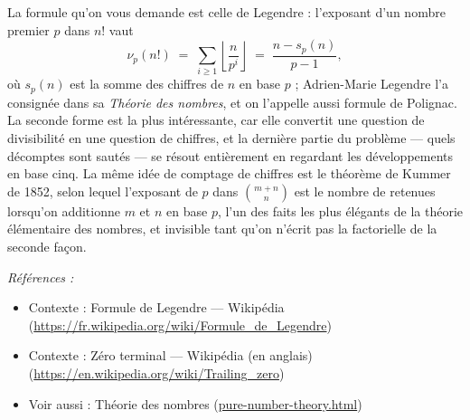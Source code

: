 \documentclass[11pt]{article}
\newenvironment{refs}{\par\small\noindent\emph{Références :}\begin{itemize}\setlength\itemsep{0pt}}{\end{itemize}\normalsize}
\begin{document}
\noindent La formule qu'on vous demande est celle de Legendre : l'exposant d'un
nombre premier $ p $ dans $ n! $ vaut
\[ \nu_p(n!) \;=\; \sum_{i \ge 1} \left\lfloor \frac{n}{p^{i}} \right\rfloor
\;=\; \frac{n - s_p(n)}{p - 1}, \]
où $ s_p(n) $ est la somme des chiffres de $ n $ en base $ p $ ; Adrien-Marie Legendre
l'a consignée dans sa \textit{Théorie des nombres}, et on l'appelle aussi formule de Polignac.
La seconde forme est la plus intéressante, car elle convertit une question de divisibilité
en une question de chiffres, et la dernière partie du problème --- quels décomptes sont sautés
--- se résout entièrement en regardant les développements en base cinq. La même idée de
comptage de chiffres est le théorème de Kummer de 1852, selon lequel l'exposant de $ p $
dans $ \binom{m+n}{n} $ est le nombre de retenues lorsqu'on additionne $ m $ et $ n $
en base $ p $, l'un des faits les plus élégants de la théorie élémentaire des nombres, et
invisible tant qu'on n'écrit pas la factorielle de la seconde façon.

\begin{refs}
\item Contexte : Formule de Legendre --- Wikipédia (\url{https://fr.wikipedia.org/wiki/Formule_de_Legendre})
\item Contexte : Zéro terminal --- Wikipédia (en anglais) (\url{https://en.wikipedia.org/wiki/Trailing_zero})
\item Voir aussi : Théorie des nombres (\url{pure-number-theory.html})
\end{refs}

\bigskip
\end{document}
